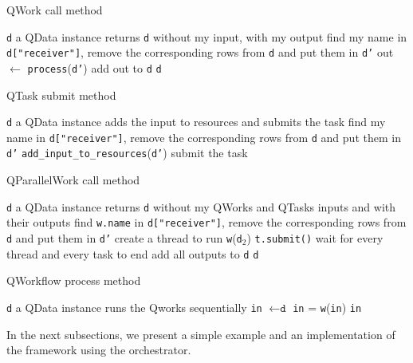 \documentclass[10pt, conference, compsocconf]{IEEEtran}
\begin{document}
\begin{algorithm}[H]
\caption{QWork call method}
\label{alg:Qwork}
\small
\begin{algorithmic}
\REQUIRE \texttt{d} a QData instance
\ENSURE returns \texttt{d} without my input, with my output
\STATE find my name in \texttt{d["receiver"]}, remove the corresponding rows from \texttt{d} and put them in \texttt{d'}
\STATE out $\leftarrow$ \texttt{process}(\texttt{d'})
\STATE add out to \texttt{d}
\RETURN \texttt{d}
\end{algorithmic}
\end{algorithm}
\begin{algorithm}[H]
\caption{QTask submit method}
\label{alg:Qtask}
\small
\begin{algorithmic}
\REQUIRE \texttt{d} a QData instance
\ENSURE adds the input to resources and submits the task
\STATE find my name in \texttt{d["receiver"]}, remove the corresponding rows from \texttt{d} and put them in \texttt{d'}
\STATE \texttt{add\_input\_to\_resources}(\texttt{d'})
\STATE submit the task
\end{algorithmic}
\end{algorithm}
\begin{algorithm}[H]
\caption{QParallelWork call method}
\label{alg:Qparallel}
\small
\begin{algorithmic}
\REQUIRE \texttt{d} a QData instance
\ENSURE returns \texttt{d} without my QWorks and QTasks inputs and with their outputs
\STATE find \texttt{w.name} in \texttt{d["receiver"]}, remove the corresponding rows from \texttt{d} and put them in \texttt{d'}
\ENDFOR
{}
\STATE create a thread to run \texttt{w}(\texttt{d$_2$})
\ENDFOR
{}
\STATE \texttt{t.submit()}
\ENDFOR
\STATE wait for every thread and every task to end
\STATE add all outputs to \texttt{d}
\RETURN \texttt{d}
\end{algorithmic}
\end{algorithm}
\begin{algorithm}[]
\caption{QWorkflow process method}
\label{alg:Qworkflow}
\small
\begin{algorithmic}
 \REQUIRE \texttt{d} a QData instance
\ENSURE runs the Qworks sequentially
\STATE \texttt{in} $\leftarrow \texttt{d}$
\STATE \texttt{in} = \texttt{w}(\texttt{in})
\ENDFOR
\RETURN \texttt{in}
\end{algorithmic}
\end{algorithm}
In the next subsections, we present a simple example and an implementation of the framework using the orchestrator.
 
\end{document}
